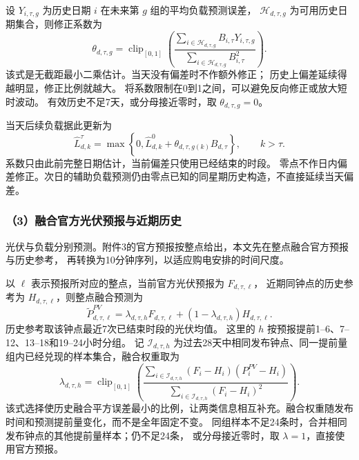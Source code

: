 设 $Y_{i,\tau,g}$ 为历史日期 $i$ 在未来第 $g$ 组的平均负载预测误差，
$\mathcal H_{d,\tau,g}$ 为可用历史日期集合，则修正系数为
\begin{equation}
\theta_{d,\tau,g}=\operatorname{clip}_{[0,1]}
\left(\frac{\sum_{i\in\mathcal H_{d,\tau,g}}B_{i,\tau}Y_{i,\tau,g}}
{\sum_{i\in\mathcal H_{d,\tau,g}}B_{i,\tau}^{2}}\right).
\end{equation}
该式是无截距最小二乘估计。当天没有偏差时不作额外修正；
历史上偏差延续得越明显，修正比例就越大。
将系数限制在0到1之间，可以避免反向修正或放大短时波动。
有效历史不足7天，或分母接近零时，取 $\theta_{d,\tau,g}=0$。

当天后续负载据此更新为
\begin{equation}
\widehat L_{d,k}^{\tau}
=\max\left\{0,\widehat L^{0}_{d,k}
+\theta_{d,\tau,g(k)}B_{d,\tau}\right\},\qquad k>\tau.
\end{equation}
系数只由此前完整日期估计，当前偏差只使用已经结束的时段。
零点不作日内偏差修正。次日的辅助负载预测仍由零点已知的同星期历史构造，不直接延续当天偏差。

\subsubsection*{（3）融合官方光伏预报与近期历史}

光伏与负载分别预测。附件3的官方预报按整点给出，本文先在整点融合官方预报与历史参考，
再转换为10分钟序列，以适应购电安排的时间尺度。

以 $\ell$ 表示预报所对应的整点，当前官方光伏预报为 $F_{d,\tau,\ell}$，
近期同钟点的历史参考为 $H_{d,\tau,\ell}$，则整点融合预测为
\begin{equation}
\widetilde P^{PV}_{d,\tau,\ell}
=\lambda_{d,\tau,h}F_{d,\tau,\ell}
+(1-\lambda_{d,\tau,h})H_{d,\tau,\ell}.
\end{equation}
历史参考取该钟点最近7次已结束时段的光伏均值。
这里的 $h$ 按预报提前1--6、7--12、13--18和19--24小时分组。
记 $\mathcal I_{d,\tau,h}$ 为过去28天中相同发布钟点、同一提前量组内已经兑现的样本集合，融合权重取为
\begin{equation}
\lambda_{d,\tau,h}
=\operatorname{clip}_{[0,1]}
\left(\frac{\sum_{i\in\mathcal I_{d,\tau,h}}(F_i-H_i)(P^{PV}_i-H_i)}
{\sum_{i\in\mathcal I_{d,\tau,h}}(F_i-H_i)^2}\right).
\end{equation}
该式选择使历史融合平方误差最小的比例，让两类信息相互补充。融合权重随发布时间和预测提前量变化，而不是全年固定不变。
同组样本不足24条时，合并相同发布钟点的其他提前量样本；仍不足24条，
或分母接近零时，取 $\lambda=1$，直接使用官方预报。

